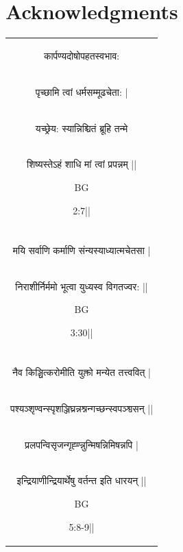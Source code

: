 \documentclass[PhD]{iiitd}
\begin{document}
\chapter*{Acknowledgments}
\begin{table}[th]
    \centering
    \begin{tabular}{c}
\begin{sanskrit}कार्पण्यदोषोपहतस्वभाव:\end{sanskrit}\\
\begin{sanskrit}पृच्छामि त्वां धर्मसम्मूढचेता: |\end{sanskrit}\\
\begin{sanskrit}यच्छ्रेय: स्यान्निश्चितं ब्रूहि तन्मे\end{sanskrit}\\
\begin{sanskrit}शिष्यस्तेऽहं शाधि मां त्वां प्रपन्नम् ||\end{sanskrit}BG \begin{sanskrit}2:7||\end{sanskrit}\\\\
\begin{sanskrit}मयि सर्वाणि कर्माणि संन्यस्याध्यात्मचेतसा |\end{sanskrit}\\
\begin{sanskrit}निराशीर्निर्ममो भूत्वा युध्यस्व विगतज्वर: ||\end{sanskrit}BG \begin{sanskrit}3:30||\end{sanskrit}\\\\
\begin{sanskrit}
    नैव किञ्चित्करोमीति युक्तो मन्येत तत्त्ववित् |\end{sanskrit}\\
\begin{sanskrit} पश्यञ्शृण्वन्स्पृशञ्जिघ्रन्नश्नन्गच्छन्स्वपञ्श्वसन् ||\end{sanskrit}\\
\begin{sanskrit}प्रलपन्विसृजन्गृह्ण्न्नुन्मिषन्निमिषन्नपि |\end{sanskrit}\\
\begin{sanskrit}इन्द्रियाणीन्द्रियार्थेषु वर्तन्त इति धारयन् ||\end{sanskrit}BG \begin{sanskrit}5:8-9||\end{sanskrit}\\
    
\end{tabular}
\end{table}
\end{document}
